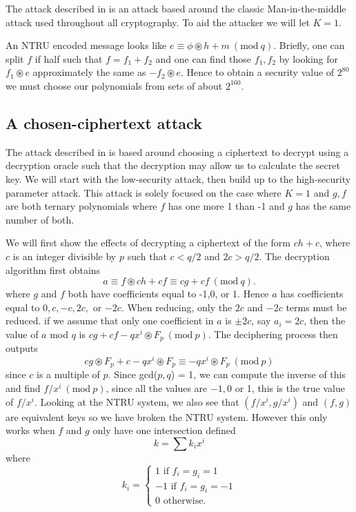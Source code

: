 \documentclass[12pt]{amsart}
\theoremstyle{definition}
\theoremstyle{remark}
\newcommand{\Mod}[1]{\ (\mathrm{mod}\ #1)}
\begin{document}
The attack described in \cite{ManInMiddle} is an attack based around the classic Man-in-the-middle attack used throughout all cryptography. To aid the attacker we will let $K = 1$.

An NTRU encoded message looks like $e \equiv \phi\circledast h + m\Mod{q}$. Briefly, one can split $f$ if half such that $f = f_1 + f_2$ and one can find those $f_1,f_2$ by looking for $f_1\circledast e$ approximately the same as $-f_2\circledast e$. Hence to obtain a security value of $2^{80}$ we must choose our polynomials from sets of about $2^{160}$.

\subsection{A chosen-ciphertext attack} 
The attack described in \cite{ChosenCipherAttack} is based around choosing a ciphertext to decrypt using a decryption oracle such that the decryption may allow us to calculate the secret key. We will start with the low-security attack, then build up to the high-security parameter attack. This attack is solely focused on the case where $K=1$ and $g,f$ are both ternary polynomials where $f$ has one more 1 than -1 and $g$ has the same number of both.

We will first show the effects of decrypting a ciphertext of the form $ch+c$, where $c$ is an integer divisible by $p$ such that $c<q/2$ and $2c>q/2$. The decryption algorithm first obtains $$a\equiv f\circledast ch + cf \equiv cg+ cf \Mod{q}.$$
where $g$ and $f$ both have coefficients equal to -1,0, or 1. Hence $a$ has coefficients equal to $0,c,-c,2c,$ or $-2c$. When reducing, only the $2c$ and $-2c$ terms must be reduced. if we assume that only one coefficient in $a$ is $\pm 2c$, say $a_i = 2c$, then the value of $a$ mod $q$ is $cg+cf -qx^i\circledast F_p \Mod{p}$. The deciphering process then outputs
$$cg\circledast F_p + c - qx^i\circledast F_p \equiv -qx^i\circledast F_p\Mod{p}$$
since $c$ is a multiple of $p$. Since gcd($p,q$) = 1, we can compute the inverse of this and find $f/x^i \Mod{p}$, since all the values are $-1,0$ or 1, this is the true value of $f/x^i$. Looking at the NTRU system, we also see that $(f/x^i, g/x^i)$ and $(f,g)$ are equivalent keys so we have broken the NTRU system. However this only works when $f$ and $g$ only have one intersection defined 
$$ k = \sum k_ix^i$$
where
$$k_i = \begin{cases} 
      1 \text{ if } f_i=g_i=1\\
      -1 \text{ if } f_i=g_i=-1\\
      0 \text{ otherwise.}
   \end{cases}$$
\\
\end{document}
